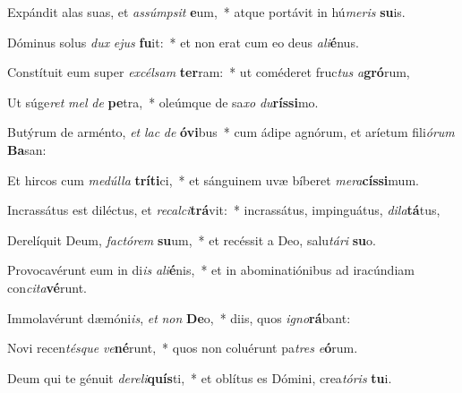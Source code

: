 \item Expándit alas suas, et \textit{as}\textit{súmp}\textit{sit} \textbf{e}um,~* atque portávit in hú\textit{me}\textit{ris} \textbf{su}is.
\item Dóminus solus \textit{dux} \textit{e}\textit{jus} \textbf{fu}it:~* et non erat cum eo deus \textit{a}\textit{li}\textbf{é}nus.
\item Constítuit eum super \textit{ex}\textit{cél}\textit{sam} \textbf{ter}ram:~* ut coméderet fruc\textit{tus} \textit{a}\textbf{gró}rum,
\item Ut súge\textit{ret} \textit{mel} \textit{de} \textbf{pe}tra,~* oleúmque de sa\textit{xo} \textit{du}\textbf{rís}\textbf{si}mo.
\item Butýrum de arménto, \textit{et} \textit{lac} \textit{de} \textbf{ó}\textbf{vi}bus~* cum ádipe agnórum, et aríetum fili\textit{ó}\textit{rum} \textbf{Ba}san:
\item Et hircos cum \textit{me}\textit{dúl}\textit{la} \textbf{trí}\textbf{ti}ci,~* et sánguinem uvæ bíberet \textit{me}\textit{ra}\textbf{cís}\textbf{si}mum.
\item Incrassátus est diléctus, et \textit{re}\textit{cal}\textit{ci}\textbf{trá}vit:~* incrassátus, impinguátus, \textit{di}\textit{la}\textbf{tá}tus,
\item Derelíquit Deum, \textit{fac}\textit{tó}\textit{rem} \textbf{su}um,~* et recéssit a Deo, salu\textit{tá}\textit{ri} \textbf{su}o.
\item Provocavérunt eum in di\textit{is} \textit{a}\textit{li}\textbf{é}nis,~* et in abominatiónibus ad iracúndiam con\textit{ci}\textit{ta}\textbf{vé}runt.
\item Immolavérunt dæmóni\textit{is}, \textit{et} \textit{non} \textbf{De}o,~* diis, quos \textit{i}\textit{gno}\textbf{rá}bant:
\item Novi recen\textit{tés}\textit{que} \textit{ve}\textbf{né}runt,~* quos non coluérunt pa\textit{tres} \textit{e}\textbf{ó}rum.
\item Deum qui te génuit \textit{de}\textit{re}\textit{li}\textbf{quís}ti,~* et oblítus es Dómini, crea\textit{tó}\textit{ris} \textbf{tu}i.
